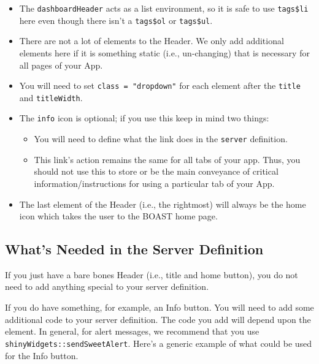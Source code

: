 \documentclass[
]{book}
\providecommand{\tightlist}{%
  \setlength{\itemsep}{0pt}\setlength{\parskip}{0pt}}
\begin{document}
\begin{itemize}
\tightlist
\item
  The \texttt{dashboardHeader} acts as a list environment, so it is safe to use \texttt{tags\$li} here even though there isn't a \texttt{tags\$ol} or \texttt{tags\$ul}.
\item
  There are not a lot of elements to the Header. We only add additional elements here if it is something static (i.e., un-changing) that is necessary for all pages of your App.
\item
  You will need to set \texttt{class\ =\ "dropdown"} for each element after the \texttt{title} and \texttt{titleWidth}.
\item
  The \texttt{info} icon is optional; if you use this keep in mind two things:

  \begin{itemize}
  \tightlist
  \item
    You will need to define what the link does in the \texttt{server} definition.
  \item
    This link's action remains the same for all tabs of your app. Thus, you should not use this to store or be the main conveyance of critical information/instructions for using a particular tab of your App.
  \end{itemize}
\item
  The last element of the Header (i.e., the rightmost) will always be the home icon which takes the user to the BOAST home page.
\end{itemize}

\hypertarget{whats-needed-in-the-server-definition-4}{%
\subsection{What's Needed in the Server Definition}\label{whats-needed-in-the-server-definition-4}}

If you just have a bare bones Header (i.e., title and home button), you do not need to add anything special to your server definition.

If you do have something, for example, an Info button. You will need to add some additional code to your server definition. The code you add will depend upon the element. In general, for alert messages, we recommend that you use \texttt{shinyWidgets::sendSweetAlert}. Here's a generic example of what could be used for the Info button.
\end{document}

